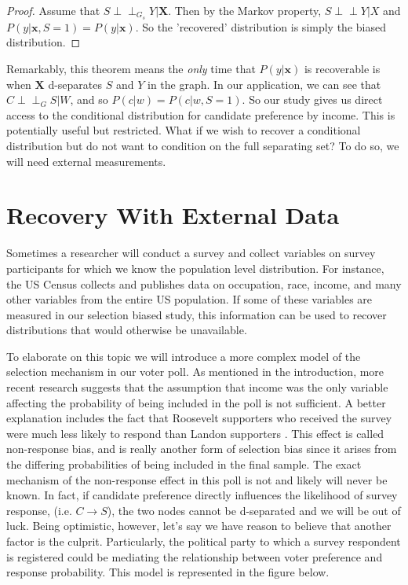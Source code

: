 \documentclass[12pt,twoside]{reedthesis}
\theoremstyle{definition}
\newcommand{\dsep}{\perp \!\!\!\perp}
\begin{document}
\begin{proof}
Assume that $S \dsep_{G_s} Y | \mathbf{X}$. Then by the Markov property, $S \dsep Y | X$ and $P(y | \mathbf{x}, S = 1) = P(y | \mathbf{x})$. So the 'recovered' distribution is simply the biased distribution.
\end{proof} 

Remarkably, this theorem means the \emph{only} time that $P(y | \mathbf{x})$ is recoverable is when $\mathbf{X}$ d-separates $S$ and $Y$ in the graph. In our application, we can see that $C \dsep_G S | W$, and so $P(c|w) = P(c|w, S = 1)$. So our study gives us direct access to the conditional distribution for candidate preference by income. This is potentially useful but restricted. What if we wish to recover a conditional distribution but do not want to condition on the full separating set? To do so, we will need external measurements.

\section{Recovery With External Data}

Sometimes a researcher will conduct a survey and collect variables on survey participants for which we know the population level distribution. For instance, the US Census collects and publishes data on occupation, race, income, and many other variables from the entire US population. If some of these variables are measured in our selection biased study, this information can be used to recover distributions that would otherwise be unavailable. 

To elaborate on this topic we will introduce a more complex model of the selection mechanism in our voter poll. As mentioned in the introduction, more recent research suggests that the assumption that income was the only variable affecting the probability of being included in the poll is not sufficient. A better explanation includes the fact that Roosevelt supporters who received the survey were much less likely to respond than Landon supporters \cite{lusinchi_2012}. This effect is called non-response bias, and is really another form of selection bias since it arises from the differing probabilities of being included in the final sample. The exact mechanism of the non-response effect in this poll is not and likely will never be known. In fact, if candidate preference directly influences the likelihood of survey response, (i.e. $C \rightarrow S$), the two nodes cannot be d-separated and we will be out of luck. Being optimistic, however, let's say we have reason to believe that another factor is the culprit. Particularly, the political party to which a survey respondent is registered could be mediating the relationship between voter preference and response probability. This model is represented in the figure below.
\end{document}
